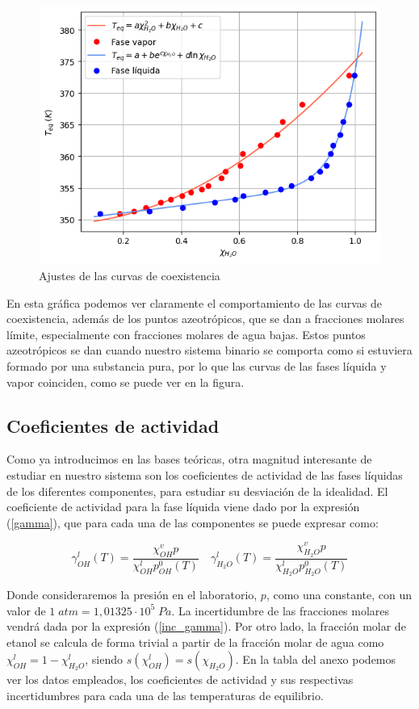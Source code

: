 \documentclass[a4paper,12pt,titlepage]{article}
\begin{document}
\begin{figure}[h!]
    \centering
    \includegraphics[width=0.65\linewidth]{ELV binario/ajustes_curva.png}
    \caption{Ajustes de las curvas de coexistencia}
    \label{fig:enter-label}
\end{figure}

En esta gráfica podemos ver claramente el comportamiento de las curvas de coexistencia, además de los puntos azeotrópicos, que se dan a fracciones molares límite, especialmente con fracciones molares de agua bajas. Estos puntos azeotrópicos se dan cuando nuestro sistema binario se comporta como si estuviera formado por una substancia pura, por lo que las curvas de las fases líquida y vapor coinciden, como se puede ver en la figura.

\subsection{Coeficientes de actividad}

Como ya introducimos en las bases teóricas, otra magnitud interesante de estudiar en nuestro sistema son los coeficientes de actividad de las fases líquidas de los diferentes componentes, para estudiar su desviación de la idealidad.  El coeficiente de actividad para la fase líquida viene dado por la expresión (\ref{gamma}), que para cada una de las componentes se puede expresar como:

\begin{equation}
    \gamma_{OH}^l(T) = \frac{\chi_{OH}^v p}{\chi_{OH}^l p_{OH}^0(T)} \quad
    \gamma_{H_2O}^l(T) = \frac{\chi_{H_2O}^v p}{\chi_{H_2O}^l p_{H_2O}^0(T)}
\end{equation}

Donde consideraremos la presión en el laboratorio, $p$, como una constante, con un valor de $1\; atm=1,01325 \cdot 10^5 \; Pa$. La incertidumbre de las fracciones molares vendrá dada por la expresión (\ref{inc_gamma}). Por otro lado, la fracción molar de etanol se calcula de forma trivial a partir de la fracción molar de agua como $\chi_{OH}^l = 1 - \chi_{H_2O}^l$, siendo $s(\chi_{OH}^l) = s(\chi_{H_2O})$. En la tabla del anexo podemos ver los datos empleados, los coeficientes de actividad y sus respectivas incertidumbres para cada una de las temperaturas de equilibrio.
\end{document}
